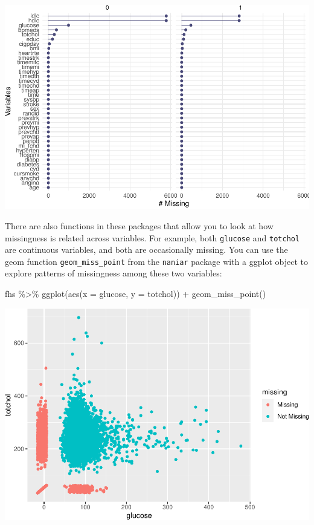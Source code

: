 \documentclass[
]{book}
\newenvironment{Shaded}{\begin{snugshade}}{\end{snugshade}}
\newcommand{\AttributeTok}[1]{\textcolor[rgb]{0.77,0.63,0.00}{#1}}
\newcommand{\FunctionTok}[1]{\textcolor[rgb]{0.00,0.00,0.00}{#1}}
\newcommand{\NormalTok}[1]{#1}
\newcommand{\SpecialCharTok}[1]{\textcolor[rgb]{0.00,0.00,0.00}{#1}}
\begin{document}
\includegraphics{adv_epi_analysis_files/figure-latex/unnamed-chunk-77-1.pdf}

There are also functions in these packages that allow you to look at how
missingness is related across variables. For example, both \texttt{glucose} and
\texttt{totchol} are continuous variables, and both are occasionally missing. You
can use the geom function \texttt{geom\_miss\_point} from the \texttt{naniar} package
with a ggplot object to explore patterns of missingness among these two
variables:

\begin{Shaded}
\begin{Highlighting}[]
\NormalTok{fhs }\SpecialCharTok{\%\textgreater{}\%} 
  \FunctionTok{ggplot}\NormalTok{(}\FunctionTok{aes}\NormalTok{(}\AttributeTok{x =}\NormalTok{ glucose, }\AttributeTok{y =}\NormalTok{ totchol)) }\SpecialCharTok{+} 
  \FunctionTok{geom\_miss\_point}\NormalTok{()}
\end{Highlighting}
\end{Shaded}

\includegraphics{adv_epi_analysis_files/figure-latex/unnamed-chunk-78-1.pdf}
\end{document}

